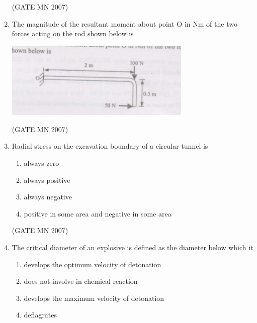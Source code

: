\documentclass[journal]{IEEEtran}
\begin{document}
\begin{enumerate}
		\hfill (GATE MN 2007)

    \item The magnitude of the resultant moment about point O in Nm of the two forces acting on the rod shown below is
    \begin{center}
        \includegraphics[width=0.7\textwidth]{Screenshot_2025_0812_111906.png}
    \end{center}
    \begin{enumerate}
	\begin{multicols}{4}	    
        \item 25 
        \item 125 
        \item 175 
        \item 225 
	\end{multicols}	
    \end{enumerate}

		\hfill (GATE MN 2007)

    \item Radial stress on the excavation boundary of a circular tunnel is
    \begin{enumerate}
		    
        \item always zero
        \item always positive
        \item always negative
        \item positive in some area and negative in some area
		
    \end{enumerate}

    \hfill (GATE MN 2007)

    \item The critical diameter of an explosive is defined as the diameter below which it
    \begin{enumerate}[label=(\Alph*)]
        \item develops the optimum velocity of detonation
        \item does not involve in chemical reaction
        \item develops the maximum velocity of detonation
        \item deflagrates
		

\end{enumerate}
\end{enumerate}
\end{document}
